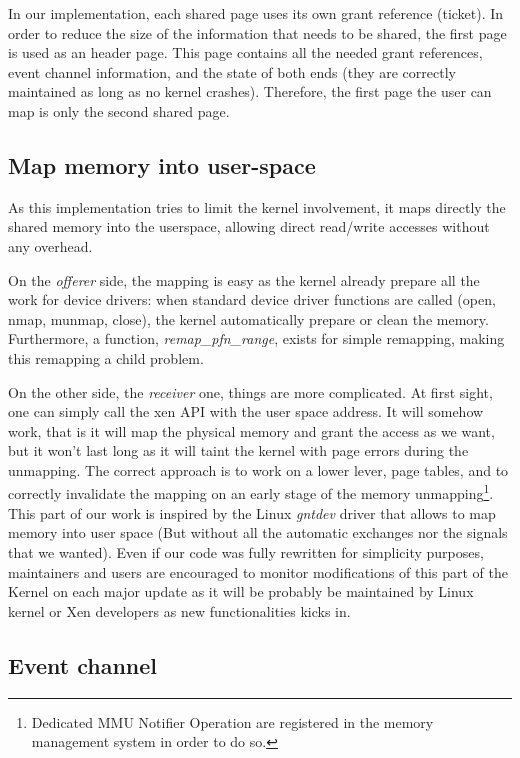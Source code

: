 \documentclass[journal]{IEEEtran}
\begin{document}
In our implementation, each shared page uses its own grant reference (ticket). In order to reduce the size of the information that needs to be shared, the first page is used as an header page. This page contains all the needed grant references, event channel information, and the state of both ends (they are correctly maintained as long as no kernel crashes). Therefore, the first page the user can map is only the second shared page. 



\subsection{Map memory into user-space}
\label{userspace}
As this implementation tries to limit the kernel involvement, it maps directly the shared memory into the userspace, allowing direct read/write accesses without any overhead.

On the \emph{offerer} side, the mapping is easy as the kernel already prepare all the work for device drivers: when standard device driver functions are called (open, nmap, munmap, close), the kernel automatically prepare or clean the memory. Furthermore, a function, \emph{remap\_pfn\_range}, exists for simple remapping, making this remapping a child problem.

On the other side, the \emph{receiver} one, things are more complicated. At first sight, one can simply call the xen API with the user space address. It will somehow work, that is it will map the physical memory and grant the access as we want, but it won't last long as it will taint the kernel with page errors during the unmapping.
The correct approach is to work on a lower lever, page tables, and to correctly invalidate the mapping on an early stage of the memory unmapping\footnote{Dedicated MMU Notifier Operation are registered in the memory management system in order to do so.}.
This part of our work is inspired by the Linux \emph{gntdev} driver that allows to map memory into user space (But without all the automatic exchanges nor the signals that we wanted). Even if our code was fully rewritten for simplicity purposes, maintainers and users are encouraged to monitor modifications of this part of the Kernel on each major update as it will be probably be maintained by Linux kernel or Xen developers as new functionalities kicks in.


\subsection{Event channel}
\end{document}
